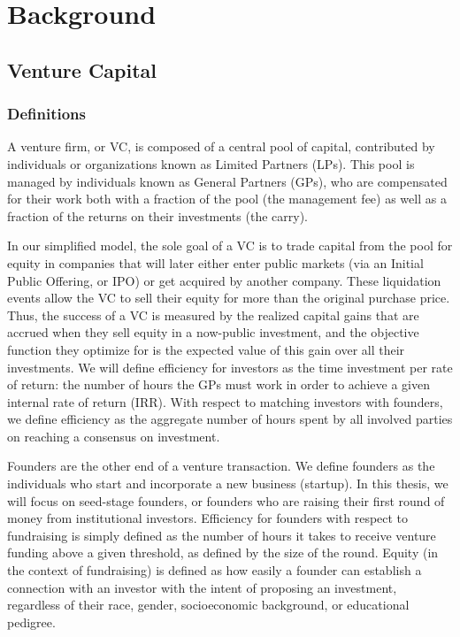 \chapter{Background}

\section{Venture Capital}

\subsection{Definitions}

A venture firm, or VC, is composed of a central pool of capital, contributed by individuals or organizations known as Limited Partners (LPs). This pool is managed by individuals known as General Partners (GPs), who are compensated for their work both with a fraction of the pool (the management fee) as well as a fraction of the returns on their investments (the carry).

In our simplified model, the sole goal of a VC is to trade capital from the pool for equity in companies that will later either enter public markets (via an Initial Public Offering, or IPO) or get acquired by another company. These liquidation events allow the VC to sell their equity for more than the original purchase price. Thus, the success of a VC is measured by the realized capital gains that are accrued when they sell equity in a now-public investment, and the objective function they optimize for is the expected value of this gain over all their investments. We will define efficiency for investors as the time investment per rate of return: the number of hours the GPs must work in order to achieve a given internal rate of return (IRR). With respect to matching investors with founders, we define efficiency as the aggregate number of hours spent by all involved parties on reaching a consensus on investment.

Founders are the other end of a venture transaction. We define founders as the individuals who start and incorporate a new business (startup). In this thesis, we will focus on seed-stage founders, or founders who are raising their first round of money from institutional investors. Efficiency for founders with respect to fundraising is simply defined as the number of hours it takes to receive venture funding above a given threshold, as defined by the size of the round. Equity (in the context of fundraising) is defined as how easily a founder can establish a connection with an investor with the intent of proposing an investment, regardless of their race, gender, socioeconomic background, or educational pedigree.


